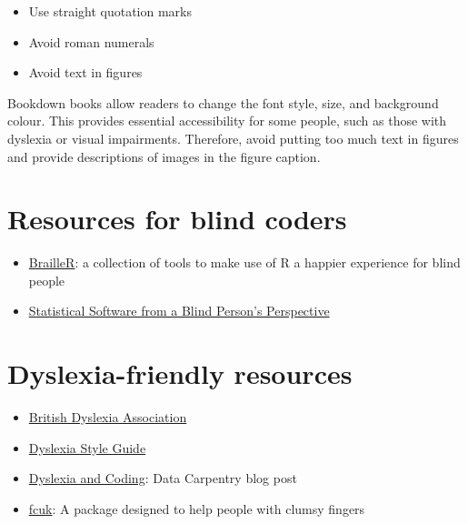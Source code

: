 \documentclass[
  oneside]{book}
\providecommand{\tightlist}{%
  \setlength{\itemsep}{0pt}\setlength{\parskip}{0pt}}
\begin{document}
\begin{itemize}
\tightlist
\item
  Use straight quotation marks
\item
  Avoid roman numerals
\item
  Avoid text in figures
\end{itemize}

Bookdown books allow readers to change the font style, size, and background colour. This provides essential accessibility for some people, such as those with dyslexia or visual impairments. Therefore, avoid putting too much text in figures and provide descriptions of images in the figure caption.

\hypertarget{resources-for-blind-coders}{%
\section{Resources for blind coders}\label{resources-for-blind-coders}}

\begin{itemize}
\tightlist
\item
  \href{https://github.com/ajrgodfrey/BrailleR}{BrailleR}: a collection of tools to make use of R a happier experience for blind people
\item
  \href{https://journal.r-project.org/archive/2013/RJ-2013-007/RJ-2013-007.pdf}{Statistical Software from a Blind Person's Perspective}
\end{itemize}

\hypertarget{dyslexia-friendly-resources}{%
\section{Dyslexia-friendly resources}\label{dyslexia-friendly-resources}}

\begin{itemize}
\tightlist
\item
  \href{https://www.bdadyslexia.org.uk/educator}{British Dyslexia Association}
\item
  \href{https://www.bdadyslexia.org.uk/advice/employers/creating-a-dyslexia-friendly-workplace/dyslexia-friendly-style-guide}{Dyslexia Style Guide}
\item
  \href{https://datacarpentry.org/blog/2017/09/coding-and-dyslexia}{Dyslexia and Coding}: Data Carpentry blog post
\item
  \href{https://cran.r-project.org/web/packages/fcuk/vignettes/fcuk.html}{fcuk}: A package designed to help people with clumsy fingers
\end{itemize}
\end{document}
